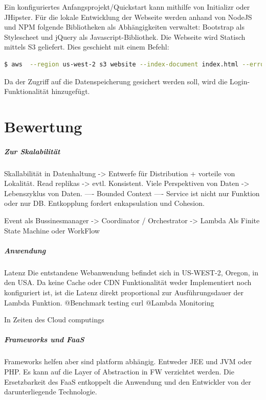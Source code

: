 \documentclass[
12pt,
english,
ngerman,
headsepline,
twoside,
openright,
numbers=noenddot,version=first
]{scrreprt}
\begin{document}
Ein konfiguriertes Anfangsprojekt/Quickstart kann mithilfe von Initializr\cite{Initializr} oder JHipster\cite{Jhipster}. Für die lokale Entwicklung der Webseite werden anhand von NodeJS und NPM folgende Bibliotheken als Abhängigkeiten verwaltet: Bootstrap als Stylescheet und jQuery als Javascript-Bibliothek.
Die Webseite wird Statisch mittels S3 geliefert. Dies geschieht mit einem Befehl: 
\begin{lstlisting}[language=BASH, caption={Webseite veröffentlichen}]
$ aws  --region us-west-2 s3 website --index-document index.html --error-document error.html 's3://koma.thb.de'
\end{lstlisting} 

Da der Zugriff auf die Datenspeicherung gesichert werden soll, wird die Login-Funktionalität hinzugefügt.


\chapter{Bewertung}

\paragraph{Zur Skalabilität}
Skallabilität in Datenhaltung -> Entwerfe für Distribution + vorteile von Lokalität.
Read replikas -> evtl. Konsistent. 
Viele Perspektiven von Daten -> Lebenszyklus von Daten. 
---- Bounded Context ---- 
Service ist nicht nur Funktion oder nur DB.
Entkopplung fordert enkapsulation und Cohesion.

Event als Bussinesmanager -> Coordinator / Orchestrator -> Lambda
Als Finite State Machine oder WorkFlow

\paragraph{Anwendung}{Latenz}
Die entstandene Webanwendung befindet sich in US-WEST-2, Oregon, in den USA. 
Da keine Cache oder CDN Funktionalität weder Implementiert noch konfiguriert ist, ist die Latenz direkt proportional zur Ausführungsdauer der Lambda Funktion.
@Benchmark testing curl 
@Lambda Monitoring

In Zeiten des Cloud computings 
\paragraph{Frameworks und FaaS}
Frameworks helfen aber sind platform abhängig. Entweder JEE und JVM oder PHP.
Es kann auf die Layer of Abstraction in FW verzichtet werden. 
Die Ersetzbarkeit des FaaS entkoppelt die Anwendung und den Entwickler von der darunterliegende Technologie.
\end{document}
